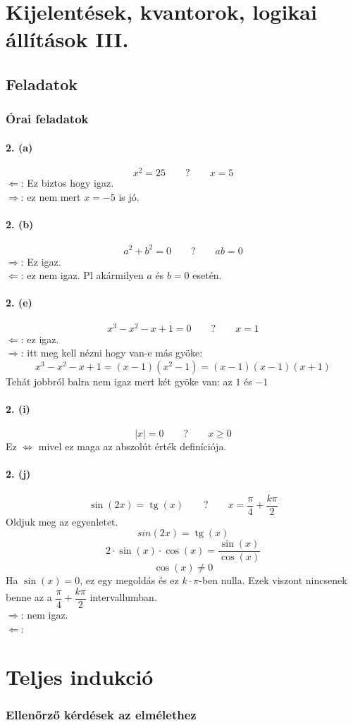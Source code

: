\documentclass[12pt,a4paper,fleqn]{article}
\newcommand{\myparagraph}[1]{\paragraph{#1}\mbox{}}
\DeclareMathOperator{\tg}{tg}
\begin{document}
\clearpage
\section{Kijelentések, kvantorok, logikai állítások III.}
\setcounter{subsection}{1}
\subsection{Feladatok}
\subsubsection{Órai feladatok}


\myparagraph{2. (a)}
\[ x^2 = 25 \qquad ? \qquad x = 5 \]
$\Leftarrow$: Ez biztos hogy igaz. \\
$\Rightarrow$: ez nem mert $x=-5$ is jó.

\myparagraph{2. (b)}
\[ a^2+b^2=0 \qquad ? \qquad ab=0 \]
$\Rightarrow$: Ez igaz. \\
$\Leftarrow$: ez nem igaz. Pl akármilyen $a$ és $b=0$ esetén.


\myparagraph{2. (e)}
\[ x^3 - x^2 - x + 1 = 0 \qquad ? \qquad x = 1 \]
$\Leftarrow$: ez igaz. \\
$\Rightarrow$: itt meg kell nézni hogy van-e más gyöke:
\[ x^3 - x^2 - x + 1 = (x-1)(x^2-1) = (x-1)(x-1)(x+1) \]
Tehát jobbról balra nem igaz mert két gyöke van: az $1$ és $-1$

\myparagraph{2. (i)}
\[ |x|=0 \qquad ? \qquad x \geq 0 \]
Ez $\iff$ mivel ez maga az abszolút érték definíciója.

\myparagraph{2. (j)}
\[ \sin(2x) = \tg(x) \qquad ? \qquad x = \dfrac{\pi}{4} + \dfrac{k\pi}{2} \]
Oldjuk meg az egyenletet.
\[ sin(2x) = \tg(x) \]
\[ 2 \cdot \sin(x) \cdot \cos(x) = \dfrac{\sin(x)}{\cos(x)} \]
\[ \cos(x) \neq 0 \]
Ha $\sin(x) = 0$, ez egy megoldás és ez $k \cdot \pi$-ben nulla. Ezek viszont
nincsenek benne az a $\dfrac{\pi}{4} + \dfrac{k\pi}{2}$ intervallumban. \\
$\Rightarrow$: nem igaz. \\
$\Leftarrow$:


\clearpage
\section{Teljes indukció}
\setcounter{subsection}{1}
\subsubsection{Ellenőrző kérdések az elmélethez}
\end{document}

